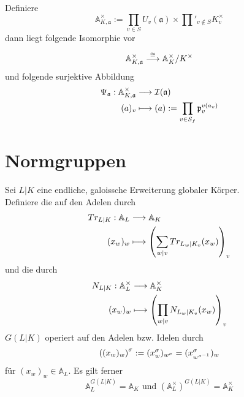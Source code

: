 \documentclass{book}
\renewcommand{\A}{\mathbb{A}}
\renewcommand{\i}{^{-1}}
\newcommand{\af}{\mathfrak{a}}
\newcommand{\pf}{\mathfrak{p}}
\begin{document}
\Bem{}
Definiere
\[ \A_{K,\af}^\times := \prod_{v \in S}U_v(\af) \times \prod'_{v\notin S} K_v^\times \]
dann liegt folgende Isomorphie vor
\[ \A_{K,\af}^\times \Pfeil{\isom{}} \A_K^\times / K^\times \]
und folgende surjektive Abbildung
\begin{align*}
\Psi_\af : \A_{K,\af}^\times &\Pfeil{} \I(\af)\\
(a)_v & \longmapsto (a) := \prod_{v\in S_f}\pf_v^{v(a_v)}
\end{align*}


\section{Normgruppen}
Sei $L|K$ eine endliche, galoissche Erweiterung globaler Körper.\\
Definiere die  auf den Adelen durch
\begin{align*}
Tr_{L|K} : \A_L & \Pfeil{} \A_K\\
(x_w)_w & \longmapsto \klam{\sum_{w |v}Tr_{L_w|K_v}(x_w) }_v
\end{align*}
und die  durch
\begin{align*}
N_{L|K} : \A_L^\times & \Pfeil{} \A_K^\times\\
(x_w)_w & \longmapsto \klam{\prod_{w |v}N_{L_w|K_v}(x_w) }_v
\end{align*}
$G(L|K)$ operiert auf den Adelen bzw. Idelen durch
\[ \klam{(x_w)_w}^\sigma := (x_w^\sigma)_{w^\sigma} = (x_{w^{\sigma\i}}^\sigma)_w \]
für $(x_w)_w \in \A_L$. Es gilt ferner
\[ \A_L^{G(L|K)} = \A_K \text{ und } (\A_L^\times)^{G(L|K)} = \A_K^\times \]
\end{document}
